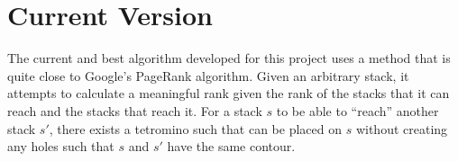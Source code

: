 \documentclass[fontsize=12pt]{article}
\begin{document}






\section{Current Version}
\label{sec:current_version}

\par The current and best algorithm developed for this project uses a method that is quite close to Google's PageRank algorithm. Given an arbitrary stack, it attempts to calculate a meaningful rank given the rank of the stacks that it can reach and the stacks that reach it. For a stack $s$ to be able to ``reach'' another stack $s'$, there exists a tetromino such that can be placed on $s$ without creating any holes such that $s$ and $s'$ have the same contour.
\end{document}
